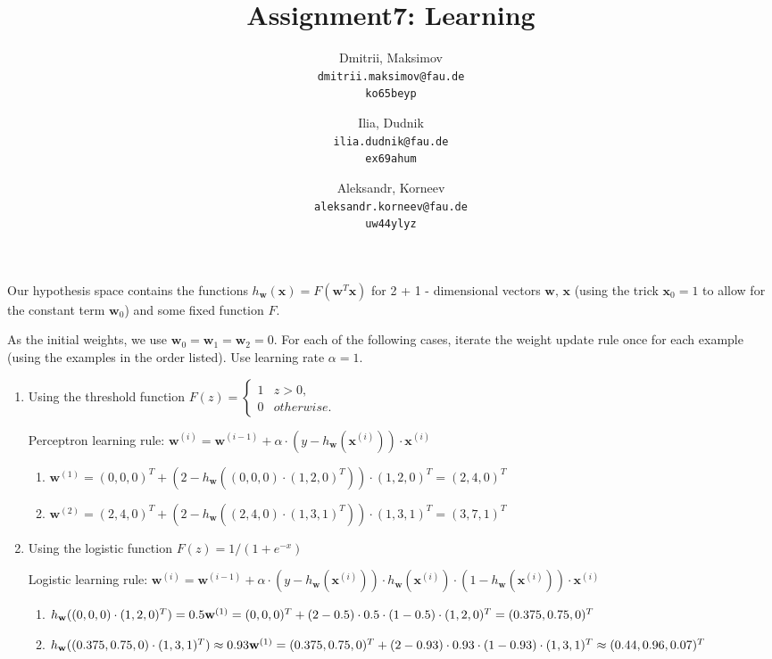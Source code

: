 \documentclass{homework}
\title{Assignment7: Learning}
\author{
  Dmitrii, Maksimov\\
  \texttt{dmitrii.maksimov@fau.de} \\
  \texttt{ko65beyp}
  \and
  Ilia, Dudnik\\
  \texttt{ilia.dudnik@fau.de}\\
  \texttt{ex69ahum}
  \and
  Aleksandr, Korneev\\
  \texttt{aleksandr.korneev@fau.de}\\
  \texttt{uw44ylyz}
}
\begin{document}
\maketitle


Our hypothesis space contains the functions $h_\textbf{w}(\textbf{x}) = F(\textbf{w}^T\textbf{x})$ for 2 + 1 - dimensional vectors $\textbf{w, x}$ (using the trick $\textbf{x}_0 = 1$ to allow for the constant term $\textbf{w}_0$) and some fixed function $F$. 

As the initial weights, we use $\textbf{w}_0 = \textbf{w}_1 = \textbf{w}_2 = 0$. For each of the following cases, iterate the weight update rule once for each example (using the examples in the order listed). Use learning rate $\alpha = 1$.

\begin{enumerate}
	\item Using the threshold function $F(z)=
	\begin{cases} 
	     1 & z >  0,\\
	     0& otherwise.
	\end{cases}$

	Perceptron learning rule: $\textbf{w}^{(i)} = \textbf{w}^{(i-1)} + \alpha \cdot(y - h_\textbf{w}(\textbf{x}^{(i)}))\cdot \textbf{x}^{(i)}$
	\begin{enumerate}[label*=\arabic*.]
		\item $\textbf{w}^{(1)} = (0,0,0)^T + (2 - h_\textbf{w}((0,0,0)\cdot(1, 2,0)^T))\cdot (1, 2,0)^T = (2,4,0)^T$
		\item $\textbf{w}^{(2)} = (2,4,0)^T + (2 - h_\textbf{w}((2,4,0)\cdot(1, 3,1)^T))\cdot (1, 3,1)^T = (3,7,1)^T$
	\end{enumerate}
	\item Using the logistic function $F(z)=1/(1+e^{-x})$

	Logistic learning rule: $\textbf{w}^{(i)} = \textbf{w}^{(i-1)} + \alpha \cdot(y - h_\textbf{w}(\textbf{x}^{(i)}))\cdot h_\textbf{w}(\textbf{x}^{(i)}) \cdot (1-h_\textbf{w}(\textbf{x}^{(i)})) \cdot \textbf{x}^{(i)}$
	\begin{enumerate}[label*=\arabic*.]
		\item $h_\textbf{w}((0,0,0)\cdot(1, 2,0)^T) = 0.5\newline
\textbf{w}^{(1)} = (0,0,0)^T + (2 - 0.5)\cdot 0.5\cdot (1-0.5)\cdot(1, 2,0)^T = (0.375,0.75,0)^T$
		\item $h_\textbf{w}((0.375,0.75,0)\cdot(1, 3,1)^T) \approx 0.93\newline
\textbf{w}^{(1)} = (0.375,0.75,0)^T + (2 - 0.93)\cdot 0.93\cdot (1-0.93)\cdot(1, 3,1)^T \approx (0.44,0.96,0.07)^T$
	\end{enumerate}
\end{enumerate}
\end{document}
